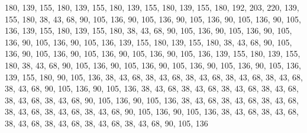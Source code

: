 180, 139, 155, 180, 139, 155, 180, 139, 155, 180, 139, 155, 180, 192, 203, 220,
139, 155, 180, 38, 43, 68, 90, 105, 136, 90, 105, 136, 90, 105, 136, 90,
105, 136, 90, 105, 136, 139, 155, 180, 139, 155, 180, 38, 43, 68, 90, 105,
136, 90, 105, 136, 90, 105, 136, 90, 105, 136, 90, 105, 136, 139, 155, 180,
139, 155, 180, 38, 43, 68, 90, 105, 136, 90, 105, 136, 90, 105, 136, 90,
105, 136, 90, 105, 136, 139, 155, 180, 139, 155, 180, 38, 43, 68, 90, 105,
136, 90, 105, 136, 90, 105, 136, 90, 105, 136, 90, 105, 136, 139, 155, 180,
90, 105, 136, 38, 43, 68, 38, 43, 68, 38, 43, 68, 38, 43, 68, 38,
43, 68, 38, 43, 68, 90, 105, 136, 90, 105, 136, 38, 43, 68, 38, 43,
68, 38, 43, 68, 38, 43, 68, 38, 43, 68, 38, 43, 68, 90, 105, 136,
90, 105, 136, 38, 43, 68, 38, 43, 68, 38, 43, 68, 38, 43, 68, 38,
43, 68, 38, 43, 68, 90, 105, 136, 90, 105, 136, 38, 43, 68, 38, 43,
68, 38, 43, 68, 38, 43, 68, 38, 43, 68, 38, 43, 68, 90, 105, 136
